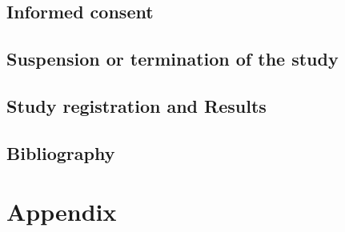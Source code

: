 \documentclass[
	a4paper, 
	11.5pt,
	headings=small, 
	twoside, 
	titlepage=firstiscover, 
 	pagesize=auto,
  	version=last,
	open=any,
	BCOR=12mm,
  	chapterprefix=false]{scrbook}
\begin{document}
\section{Informed consent}

\section{Suspension or termination of the study}

\section{Study registration and Results}

\section{Bibliography}

\chapter{Appendix}
\end{document}
